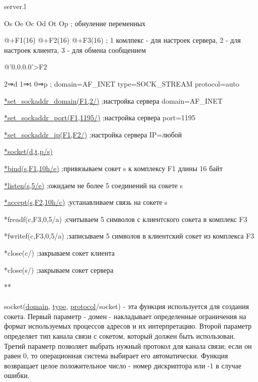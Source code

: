 \documentclass[12t]{article}
\begin{document}
\textcolor[rgb]{1,0,0}{server.l}

Os Oe Oc Od Ot Op ; обнуление переменных

@+F1(16) @+F2(16) @+F3(16) ; 1 комлпекс - для настроек сервера, 2 - для настроек клиента, 3 - для обмена сообщением

@'0.0.0.0'>F2

2⇒d 1⇒t 0⇒p ; domain=AF\_INET type=SOCK\_STREAM protocol=auto

\hyperref [set_sockaddr_domain] {*set\_sockaddr\_domain(F1,2/)} ;настройка сервера domain=AF\_INET 

\hyperref [set_sockaddr_port] {*set\_sockaddr\_port(F1,1195/)} ;настройка сервера port=1195

\hyperref [set_sockaddr_ip] {*set\_sockaddr\_ip(F1,F2/)} ;настройка сервера IP=любой

\hyperref [socket] {*socket(d,t,p/s)}

\hyperref [bind] {*bind(s,F1,10h/e)} ;привязываем сокет s к комплексу F1 длины 16 байт

\hyperref [listen] {*listen(s,5/e)} ;ожидаем не более 5 соединений на сокете s

\hyperref [accept] {*accept(s,F2,10h/c)} ;устанавливаем связь на сокете s

*freadf(c,F3,0,5/a) ;считываем 5 символов с клиентского сокета в комплекс F3

*fwritef(c,F3,0,5/a) ;записываем 5 символов в клиентский сокет из комплекса F3

*close(c/) ;закрываем сокет клиента

*close(s/) ;закрываем сокет сервера

**
~\\
~\\
\label{socket}
socket(\hyperref[domain]{domain}, \hyperref[type]{type}, \hyperref[protocol]{protocol}/socket) - эта функция используется для создания сокета. Первый параметр - домен - накладывает определенные ограничения на формат используемых процессов адресов и их интерпретацию. Второй параметр определяет тип канала связи с сокетом, который должен быть использован. Третий параметр позволяет выбрать нужный протокол для канала связи; если он равен 0, то операционная система выбирает его автоматически. Функция возвращает целое положительное число - номер дискриптора или -1 в случае ошибки.
\end{document}
